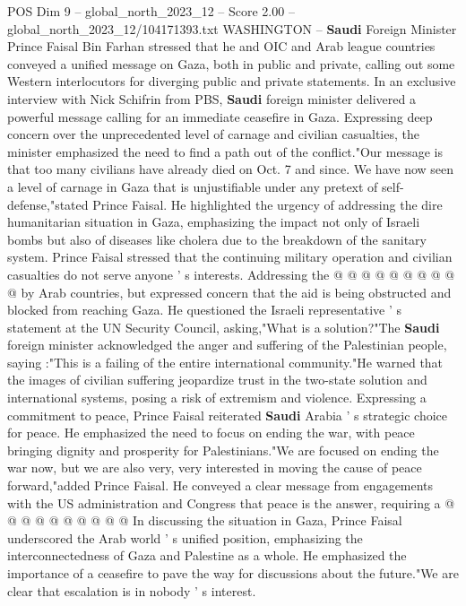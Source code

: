 \begin{textsample}{POS Dim 9 – global\_north\_2023\_12 – Score 2.00 – global\_north\_2023\_12/104171393.txt}  \label{ex:f9_pos_367}
WASHINGTON -- \textbf{Saudi} Foreign Minister Prince Faisal Bin Farhan stressed that he and OIC and Arab league countries conveyed a unified message on Gaza, both in public and private, calling out some Western interlocutors for diverging public and private statements.
In an exclusive interview with Nick Schifrin from PBS, \textbf{Saudi} foreign minister delivered a powerful message calling for an immediate ceasefire in Gaza.
Expressing deep concern over the unprecedented level of carnage and civilian casualties, the minister emphasized the need to find a path out of the conflict."Our message is that too many civilians have already died on Oct. 7 and since.
We have now seen a level of carnage in Gaza that is unjustifiable under any pretext of self-defense,"stated Prince Faisal.
He highlighted the urgency of addressing the dire humanitarian situation in Gaza, emphasizing the impact not only of Israeli bombs but also of diseases like cholera due to the breakdown of the sanitary system.
Prince Faisal stressed that the continuing military operation and civilian casualties do not serve anyone ' s interests.
Addressing the @ @ @ @ @ @ @ @ @ @ by Arab countries, but expressed concern that the aid is being obstructed and blocked from reaching Gaza.
He questioned the Israeli representative ' s statement at the UN Security Council, asking,"What is a solution?"The \textbf{Saudi} foreign minister acknowledged the anger and suffering of the Palestinian people, saying :"This is a failing of the entire international community."He warned that the images of civilian suffering jeopardize trust in the two-state solution and international systems, posing a risk of extremism and violence.
Expressing a commitment to peace, Prince Faisal reiterated \textbf{Saudi} Arabia ' s strategic choice for peace.
He emphasized the need to focus on ending the war, with peace bringing dignity and prosperity for Palestinians."We are focused on ending the war now, but we are also very, very interested in moving the cause of peace forward,"added Prince Faisal.
He conveyed a clear message from engagements with the US administration and Congress that peace is the answer, requiring a @ @ @ @ @ @ @ @ @ @ In discussing the situation in Gaza, Prince Faisal underscored the Arab world ' s unified position, emphasizing the interconnectedness of Gaza and Palestine as a whole.
He emphasized the importance of a ceasefire to pave the way for discussions about the future."We are clear that escalation is in nobody ' s interest.

\end{textsample}
